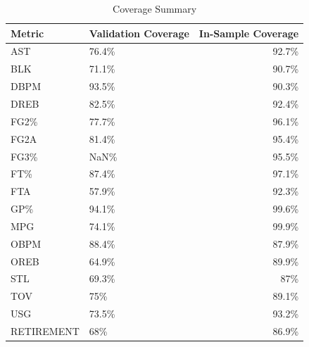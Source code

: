\begin{table}[t]
\caption*{
{\large Coverage Summary}
} 
\fontsize{12.0pt}{14.4pt}\selectfont
\begin{tabular*}{\linewidth}{@{\extracolsep{\fill}}llr}
\toprule
Metric & Validation Coverage & In-Sample Coverage \\ 
\midrule\addlinespace[2.5pt]
AST & 76.4\% & 92.7\% \\ 
BLK & 71.1\% & 90.7\% \\ 
DBPM & 93.5\% & 90.3\% \\ 
DREB & 82.5\% & 92.4\% \\ 
FG2\% & 77.7\% & 96.1\% \\ 
FG2A & 81.4\% & 95.4\% \\ 
FG3\% & NaN\% & 95.5\% \\ 
FT\% & 87.4\% & 97.1\% \\ 
FTA & 57.9\% & 92.3\% \\ 
GP\% & 94.1\% & 99.6\% \\ 
MPG & 74.1\% & 99.9\% \\ 
OBPM & 88.4\% & 87.9\% \\ 
OREB & 64.9\% & 89.9\% \\ 
STL & 69.3\% & 87\% \\ 
TOV & 75\% & 89.1\% \\ 
USG & 73.5\% & 93.2\% \\ 
RETIREMENT & 68\% & 86.9\% \\ 
\bottomrule
\end{tabular*}
\end{table}

